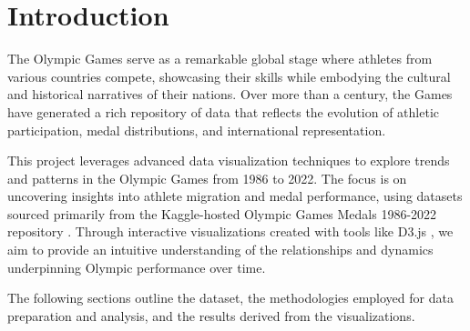 \chapter{Introduction} \label{chap:intro}

The Olympic Games serve as a remarkable global stage where athletes from various countries compete, showcasing their skills while embodying the cultural and historical narratives of their nations. Over more than a century, the Games have generated a rich repository of data that reflects the evolution of athletic participation, medal distributions, and international representation.

This project leverages advanced data visualization techniques to explore trends and patterns in the Olympic Games from 1986 to 2022. The focus is on uncovering insights into athlete migration and medal performance, using datasets sourced primarily from the Kaggle-hosted Olympic Games Medals 1986-2022 repository \cite{olympic_19862022}. Through interactive visualizations created with tools like D3.js \cite{d3}, we aim to provide an intuitive understanding of the relationships and dynamics underpinning Olympic performance over time.

The following sections outline the dataset, the methodologies employed for data preparation and analysis, and the results derived from the visualizations. %
